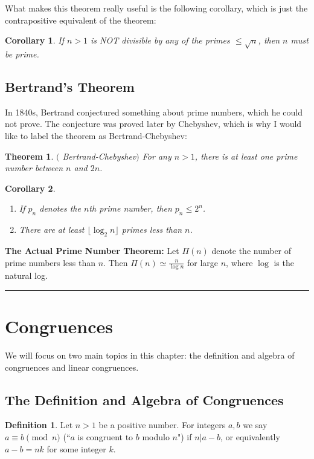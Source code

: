 \documentclass[12pt]{article}
\theoremstyle{plain}
\newtheorem{corollary}{Corollary}
\newtheorem{theorem}{Theorem}
\theoremstyle{definition}
\newtheorem{definition}{Definition}
\theoremstyle{remark}
\begin{document}
\bigskip
\noindent
What makes this theorem really useful is the following corollary, which is just the contrapositive equivalent of the theorem:
\begin{corollary}
If $n>1$ is NOT divisible by any of the primes $\leq \sqrt{n}$, then $n$ must be prime.
\end{corollary}

\bigskip
\subsection{Bertrand's Theorem}
In 1840s, Bertrand conjectured something about prime numbers, which he could not prove. The conjecture was proved later by Chebyshev, which is why I would like to label the theorem as Bertrand-Chebyshev:
\begin{theorem}$($ Bertrand-Chebyshev$)$
For any $n>1$, there is at least one prime number between $n$ and $2n$.
\end{theorem}

\bigskip
\begin{corollary}\begin{enumerate}
    \item If $p_n$ denotes the $n$th prime number, then $p_n \leq 2^n$.
    \item There are at least $\lfloor \log_2n\rfloor $ primes less than $n$.
\end{enumerate}
\end{corollary}

\bigskip
\noindent
{\bf The Actual Prime Number Theorem:} Let $\Pi(n)$ denote the number of prime numbers less than $n$. Then $\Pi(n) \simeq \frac{n}{\log n}$ for large $n$, where $\log$ is the natural log.

\bigskip
\hrule

\section{Congruences}
We will focus on two main topics in this chapter: the definition and algebra of congruences and linear congruences.
\subsection{The Definition and Algebra of Congruences}
\begin{definition}
Let $n>1$ be a positive number. For integers $a,b$ we say $a\equiv b \pmod{n}$ (``$a$ is congruent to $b$ modulo $n$") if $n|a-b$, or equivalently $a-b=nk$ for some integer $k$.
\end{definition}
\end{document}
